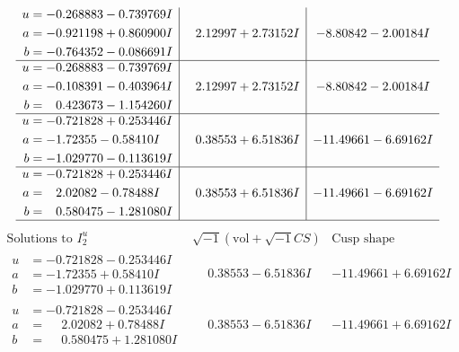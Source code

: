 \documentclass[1p]{elsarticle_modified}
\theoremstyle{definition}
\newcommand{\I}{\sqrt{-1}}
\begin{document}
$$\begin{array}{c|c|c}
\begin{aligned}
u &= -0.268883 - 0.739769 I \\
a &= -0.921198 + 0.860900 I \\
b &= -0.764352 - 0.086691 I\end{aligned}
 & \phantom{-}2.12997 + 2.73152 I & -8.80842 - 2.00184 I \\ \hline\begin{aligned}
u &= -0.268883 - 0.739769 I \\
a &= -0.108391 - 0.403964 I \\
b &= \phantom{-}0.423673 - 1.154260 I\end{aligned}
 & \phantom{-}2.12997 + 2.73152 I & -8.80842 - 2.00184 I \\ \hline\begin{aligned}
u &= -0.721828 + 0.253446 I \\
a &= -1.72355 - 0.58410 I \\
b &= -1.029770 - 0.113619 I\end{aligned}
 & \phantom{-}0.38553 + 6.51836 I & -11.49661 - 6.69162 I \\ \hline\begin{aligned}
u &= -0.721828 + 0.253446 I \\
a &= \phantom{-}2.02082 - 0.78488 I \\
b &= \phantom{-}0.580475 - 1.281080 I\end{aligned}
 & \phantom{-}0.38553 + 6.51836 I & -11.49661 - 6.69162 I\\
 \hline 
 \end{array}$$\newpage$$\begin{array}{c|c|c}  
\text{Solutions to }I^u_{2}& \I (\text{vol} + \sqrt{-1}CS) & \text{Cusp shape}\\
 \hline 
\begin{aligned}
u &= -0.721828 - 0.253446 I \\
a &= -1.72355 + 0.58410 I \\
b &= -1.029770 + 0.113619 I\end{aligned}
 & \phantom{-}0.38553 - 6.51836 I & -11.49661 + 6.69162 I \\ \hline\begin{aligned}
u &= -0.721828 - 0.253446 I \\
a &= \phantom{-}2.02082 + 0.78488 I \\
b &= \phantom{-}0.580475 + 1.281080 I\end{aligned}
 & \phantom{-}0.38553 - 6.51836 I & -11.49661 + 6.69162 I \\ \hline\begin{aligned}

\end{aligned}
\end{array}$$
\end{document}
